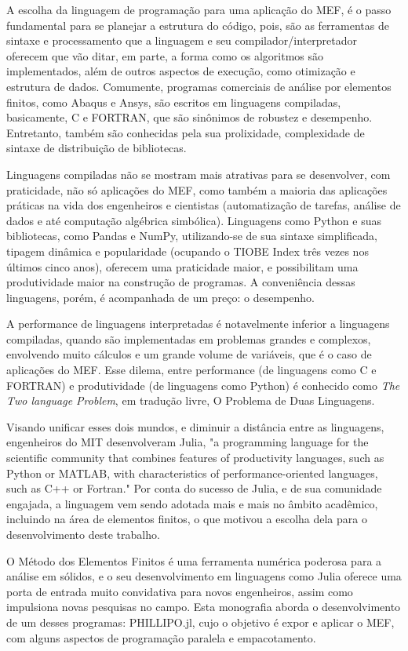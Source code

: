 A escolha da linguagem de programação para uma aplicação do MEF, é o passo fundamental para se planejar a estrutura do código, pois, são as ferramentas de sintaxe e processamento que a linguagem e seu compilador/interpretador oferecem que vão ditar, em parte, a forma como os algoritmos são implementados, além de outros aspectos de execução, como otimização e estrutura de dados. Comumente, programas comerciais de análise por elementos finitos, como Abaqus e Ansys, são escritos em linguagens compiladas, basicamente, C e FORTRAN, que são sinônimos de robustez e desempenho. Entretanto, também são conhecidas pela sua prolixidade, complexidade de sintaxe de distribuição de bibliotecas.

Linguagens compiladas não se mostram mais atrativas para se desenvolver, com praticidade, não só aplicações do MEF, como também a maioria das aplicações práticas na vida dos engenheiros e cientistas (automatização de tarefas, análise de dados e até computação algébrica simbólica). Linguagens como Python e suas bibliotecas, como Pandas e NumPy, utilizando-se de sua sintaxe simplificada, tipagem dinâmica e popularidade (ocupando o TIOBE Index três vezes nos últimos cinco anos), oferecem uma praticidade maior, e possibilitam uma produtividade maior na construção de programas. A conveniência dessas linguagens, porém, é acompanhada de um preço: o desempenho.

A performance de linguagens interpretadas é notavelmente inferior a linguagens compiladas, quando são implementadas em problemas grandes e complexos, envolvendo muito cálculos e um grande volume de variáveis, que é o caso de aplicações do MEF. Esse dilema, entre performance (de linguagens como C e FORTRAN) e produtividade (de linguagens como Python) é conhecido como \emph{The Two language Problem}, em tradução livre, O Problema de Duas Linguagens.

Visando unificar esses dois mundos, e diminuir a distância entre as linguagens, engenheiros do MIT desenvolveram Julia, "a programming language for the scientific community that combines features of productivity languages, such as Python or MATLAB, with characteristics of performance-oriented languages, such as C++ or Fortran." \cite[tradução livre]{Bezanson} Por conta do sucesso de Julia, e de sua comunidade engajada, a linguagem vem sendo adotada mais e mais no âmbito acadêmico, incluindo na área de elementos finitos, o que motivou a escolha dela para o desenvolvimento deste trabalho.

O Método dos Elementos Finitos é uma ferramenta numérica poderosa para a análise em sólidos, e o seu desenvolvimento em linguagens como Julia oferece uma porta de entrada muito convidativa para novos engenheiros, assim como impulsiona novas pesquisas no campo. Esta monografia aborda o desenvolvimento de um desses programas: PHILLIPO.jl, cujo o objetivo é expor e aplicar o MEF, com alguns aspectos de programação paralela e empacotamento.


